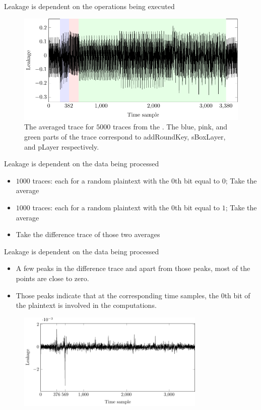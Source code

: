 \begin{frame}{Leakage is dependent on the operations being executed}
    \begin{figure}
    \centering
\includegraphics{fig/PRESENT_plot___one_round_average___highlighted_operations.pdf}
    \caption{The averaged trace for $5000$ traces from the \datafixone.
    The blue, pink, and green parts of the trace correspond to addRoundKey, sBoxLayer, and pLayer respectively.}
\end{figure}
\end{frame}

\begin{frame}{Leakage is dependent on the data being processed}
    \begin{itemize}
        \item $1000$ traces: each for a random plaintext with the $0$th bit equal to $0$; Take the average
        \item $1000$ traces: each for a random plaintext with the $0$th bit equal to $1$; Take the average
        \item Take the difference trace of those two averages
    \end{itemize}
\end{frame}

\begin{frame}{Leakage is dependent on the data being processed}
    \begin{itemize}
        \item A few peaks in the difference trace and apart from those peaks, most of the points are close to zero.
       \item Those peaks indicate that at the corresponding time samples, the $0$th bit of the plaintext is involved in the computations.
    \end{itemize}
    \begin{figure}[h]
    \centering
    \includegraphics[width=0.8\textwidth]{fig/SCA_PRESENT_bit_dif.pdf}
\end{figure}
\end{frame}


